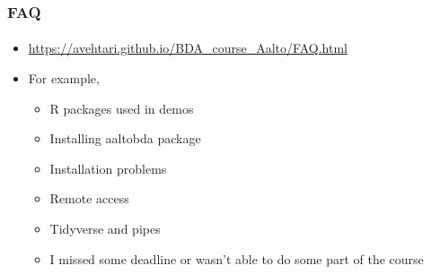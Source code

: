 \documentclass[english,t]{beamer}
\begin{document}
\begin{frame}

  \frametitle{FAQ}  %
  \framesubtitle{}

  \begin{itemize}
  \item {\small\url{https://avehtari.github.io/BDA_course_Aalto/FAQ.html}}
  \item For example,
    \begin{itemize}
    \item R packages used in demos
    \item Installing aaltobda package
    \item Installation problems
    \item Remote access
    \item Tidyverse and pipes
    \item I missed some deadline or wasn’t able to do some part of the course
    \end{itemize}
  \end{itemize}
  
\end{frame}  
\end{document}
